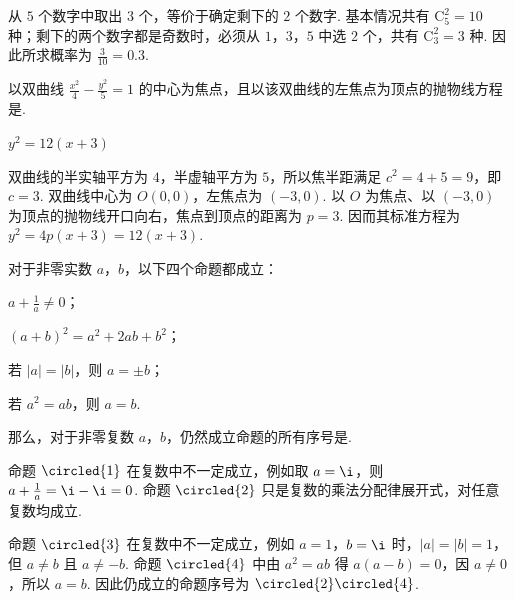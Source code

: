 \begin{solution}
从 \(5\) 个数字中取出 \(3\) 个，等价于确定剩下的 \(2\) 个数字. 基本情况共有 \(\mathrm C_5^2=10\) 种；剩下的两个数字都是奇数时，必须从 \(1\)，\(3\)，\(5\) 中选 \(2\) 个，共有 \(\mathrm C_3^2=3\) 种. 因此所求概率为 \(\frac{3}{10}=0.3\).
\end{solution}

\begin{problem}
以双曲线 \(\frac{x^2}{4} - \frac{y^2}{5} = 1\) 的中心为焦点，且以该双曲线的左焦点为顶点的抛物线方程是\fillinblank{}.
\end{problem}

\begin{answer}
\(y^2=12(x+3)\)
\end{answer}

\begin{solution}
双曲线的半实轴平方为 \(4\)，半虚轴平方为 \(5\)，所以焦半距满足 \(c^2=4+5=9\)，即 \(c=3\). 双曲线中心为 \(O(0,0)\)，左焦点为 \((-3,0)\). 以 \(O\) 为焦点、以 \((-3,0)\) 为顶点的抛物线开口向右，焦点到顶点的距离为 \(p=3\). 因而其标准方程为 \(y^2=4p(x+3)=12(x+3)\).
\end{solution}

\begin{problem}
对于非零实数 \(a\)，\(b\)，以下四个命题都成立：

\begin{circlelist}
\item \(a + \frac{1}{a} \neq 0\)；
\item \((a + b)^2 = a^2 + 2ab + b^2\)；
\item 若 \(|a| = |b|\)，则 \(a = \pm b\)；
\item 若 \(a^2 = ab\)，则 \(a = b\).
\end{circlelist}

那么，对于非零复数 \(a\)，\(b\)，仍然成立命题的所有序号是\fillinblank{}.
\end{problem}

\begin{answer}
\end{answer}

\begin{solution}
命题 \(\circled{1}\) 在复数中不一定成立，例如取 \(a=\i\)，则 \(a+\frac1a=\i-\i=0\). 命题 \(\circled{2}\) 只是复数的乘法分配律展开式，对任意复数均成立.

命题 \(\circled{3}\) 在复数中不一定成立，例如 \(a=1\)，\(b=\i\) 时，\(|a|=|b|=1\)，但 \(a\ne b\) 且 \(a\ne-b\). 命题 \(\circled{4}\) 中由 \(a^2=ab\) 得 \(a(a-b)=0\)，因 \(a\ne0\)，所以 \(a=b\). 因此仍成立的命题序号为 \(\circled{2}\circled{4}\).
\end{solution}

